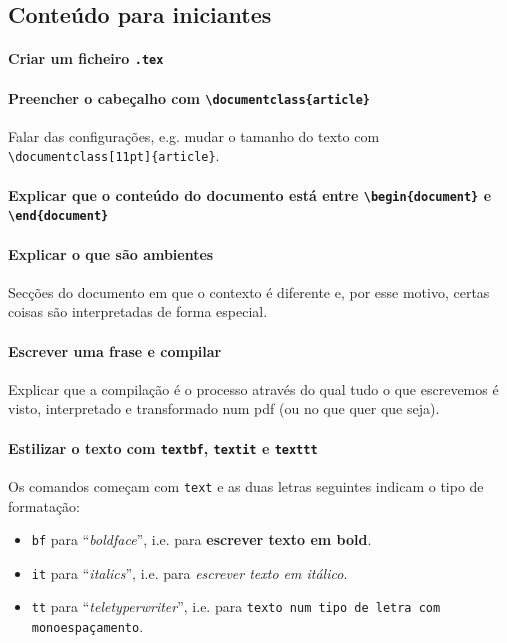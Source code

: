 \documentclass[11pt]{article}
\begin{document}
\subsection{Conteúdo para iniciantes}

\paragraph{Criar um ficheiro \texttt{.tex}}

\paragraph{Preencher o cabeçalho com \texttt{\textbackslash documentclass\{article\}}}
Falar das configurações, e.g. mudar o tamanho do texto com \\
\verb|\documentclass[11pt]{article}|.

\paragraph{Explicar que o conteúdo do documento está entre
\texttt{\textbackslash begin\{document\}} e \texttt{\textbackslash end\{document\}}}

\paragraph{Explicar o que são ambientes}
Secções do documento em que o contexto é diferente e, por esse motivo, certas
coisas são interpretadas de forma especial.

\paragraph{Escrever uma frase e compilar}
Explicar que a compilação é o processo através do qual tudo o que escrevemos
é visto, interpretado e transformado num pdf (ou no que quer que seja).

\paragraph{Estilizar o texto com \texttt{textbf}, \texttt{textit} e \texttt{texttt}}
Os comandos começam com \texttt{text} e as duas letras seguintes indicam o tipo
de formatação:
\begin{itemize}
    \item \texttt{bf} para ``\textit{boldface}'', i.e. para \textbf{escrever texto
    em bold}.
    \item \texttt{it} para ``\textit{italics}'', i.e. para \textit{escrever texto
    em itálico}.
    \item \texttt{tt} para ``\textit{teletyperwriter}'', i.e. para \texttt{texto
    num tipo de letra com monoespaçamento}.
\end{itemize}
\end{document}

